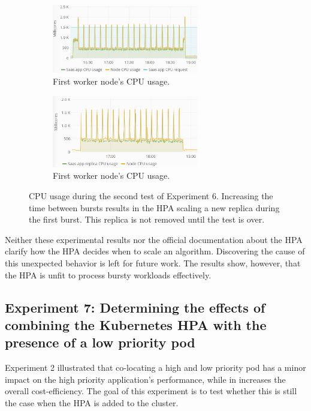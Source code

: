 \begin{figure}[h]
\centering
\begin{subfigure}[b]{\textwidth}
\centering
\includegraphics[width=0.70\textwidth]{Images/Experiments/CPU/Grafana/cpu-saas-hpa-bursty-3-1.PNG}
\caption{First worker node's CPU usage.}
\label{fig:cpu-saas-hpa-bursty-3-1}
\end{subfigure}
\hfill
\begin{subfigure}[b]{\textwidth}
\centering
\includegraphics[width=0.70\textwidth]{Images/Experiments/CPU/Grafana/cpu-saas-hpa-bursty-3-2.PNG}
\caption{First worker node's CPU usage.}
\label{fig:cpu-saas-hpa-bursty-3-2}
\end{subfigure}
\hfill
\caption{CPU usage during the second test of Experiment 6. Increasing the time between bursts results in the HPA scaling a new replica during the first burst. This replica is not removed until the test is over.}
\label{fig:cpu-saas-hpa-bursty-2}
\end{figure}

Neither these experimental results nor the official documentation about the HPA \citep{hpa-algorithm-details} clarify how the HPA decides when to scale an algorithm. Discovering the cause of this unexpected behavior is left for future work. The results show, however, that the HPA is unfit to process bursty workloads effectively.




\subsection{Experiment 7: Determining the effects of combining the Kubernetes HPA with the presence of a low priority pod}
Experiment 2 illustrated that co-locating a high and low priority pod has a minor impact on the high priority application's performance, while in increases the overall cost-efficiency. The goal of this experiment is to test whether this is still the case when the HPA is added to the cluster. 


